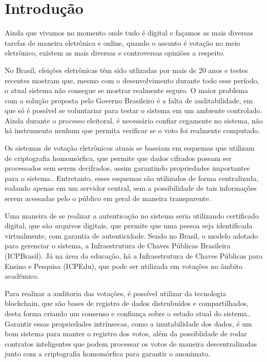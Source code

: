\documentclass{ufsctex/ufsctex}
\begin{document}
\capa{}

\pretextuais{}

\listadefiguras{}

\listadetabelas{}

\listadeabreviaturas{}

\listadesimbolos{}

\sumario{}

\chapter{Introdução}
Ainda que vivamos no momento onde tudo é digital e façamos as mais diversas tarefas de maneira
eletrônica e online, quando o assunto é votação no meio eletrônico, existem as mais diversas e
controversas opiniões a respeito.

No Brasil, eleições eletrônicas têm sido utlizadas por mais de 20 anos e testes recentes mostram
que, mesmo com o desenvolvimento durante todo esse período, o atual sistema não consegue
se mostrar realmente seguro\cite{aranha}. O maior problema com a solução proposta pelo
Governo Brasileiro é a falta de auditabilidade, em que só é possível se voluntariar para testar
o sistema em um ambiente controlado. Ainda durante o processo eleitoral, é necessário confiar
cegamente no sistema, não há instrumento nenhum que permita verificar se o voto foi
realmente computado.

Os sistemas de votação eletrônicos atuais se baseiam em esquemas que utilizam de criptografia
homomórfica, que permite que dados cifrados possam ser processados sem serem decifrados, assim
garantindo propriedades importantes para o sistema.\cite{springer}. Entretanto, esses esquemas
são utilizados de forma centralizada, rodando apenas em um servidor central, sem a possibilidade
de tais informações serem acessadas pelo o público em geral de maneira transparente.

Uma maneira de se realizar a autenticação no sistema seria utilizando certificado
digital, que são arquivos digitais, que permite que uma pessoa seja identificada
virtualmente, com garantia de autenticidade\cite{pki}. Sendo no Brasil, o modelo adotado para
gerenciar o sistema, a Infraestrutura de Chaves Públicas Brasileira (ICPBrasil). Já na área
da educação, há a Infraestrutura de Chaves Públicas para Ensino e Pesquisa (ICPEdu), que
pode ser utilizada em votações no âmbito acadêmico.

Para realizar a auditoria das votações, é possível utilizar da tecnologia
blockchain, que são bases de registro de dados distrubuídos e compartilhados,
desta forma criando um consenso e confiança sobre o estado atual do sistema.\cite{nakamoto2012bitcoin}.
Garantir essas propriedades intrínsecas, como a imutabilidade dos
dados, é um bom sistema para manter o registro dos votos, além da possiblidade de rodar
contratos inteligentes que podem processar os votos de maneira descentralizadas junto
com a criptografia homomórfica para garantir o anonimato.
\end{document}
